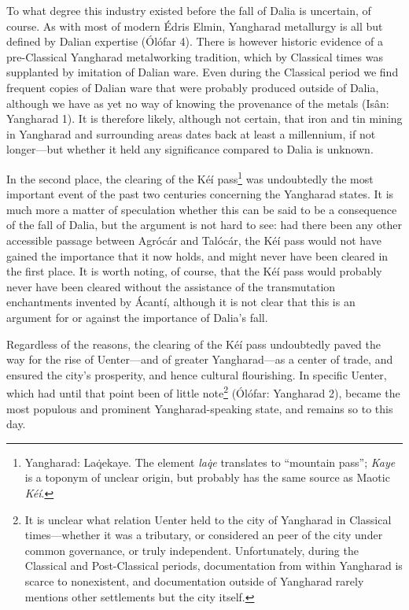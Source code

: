 \documentclass{article}
\begin{document}
{To what degree this industry existed before the fall of Dalia is uncertain, of course. As with most of modern Édris Elmin, Yangharad metallurgy is all but defined by Dalian expertise (Ólófar 4). There is however historic evidence of a pre-Classical Yangharad metalworking tradition, which by Classical times was supplanted by imitation of Dalian ware. Even during the Classical period we find frequent copies of Dalian ware that were probably produced outside of Dalia, although we have as yet no way of knowing the provenance of the metals (Isân: Yangharad 1). It is therefore likely, although not certain, that iron and tin mining in Yangharad and surrounding areas dates back at least a millennium, if not longer—but whether it held any significance compared to Dalia is unknown.

In the second place, the clearing of the Kéí pass\footnote{Yangharad: La\.{q}ekaye. The element \textit{la\.{q}e} translates to ``mountain pass''; \textit{Kaye} is a toponym of unclear origin, but probably has the same source as Maotic \textit{Kéí}.} was undoubtedly the most important event of the past two centuries concerning the Yangharad states. It is much more a matter of speculation whether this can be said to be a consequence of the fall of Dalia, but the argument is not hard to see: had there been any other accessible passage between Agrócár and Talócár, the Kéí pass would not have gained the importance that it now holds, and might never have been cleared in the first place. It is worth noting, of course, that the Kéí pass would probably never have been cleared without the assistance of the transmutation enchantments invented by Ácantí, although it is not clear that this is an argument for or against the importance of Dalia's fall.

Regardless of the reasons, the clearing of the Kéí pass undoubtedly paved the way for the rise of Uenter—and of greater Yangharad—as a center of trade, and ensured the city's prosperity, and hence cultural flourishing. In specific Uenter, which had until that point been of little note\footnote{It is unclear what relation Uenter held to the city of Yangharad in Classical times—whether it was a tributary, or considered an peer of the city under common governance, or truly independent. Unfortunately, during the Classical and Post-Classical periods, documentation from within Yangharad is scarce to nonexistent, and documentation outside of Yangharad rarely mentions other settlements but the city itself.} (Ólófar: Yangharad 2), became the most populous and prominent Yangharad-speaking state, and remains so to this day.

}
\end{document}
